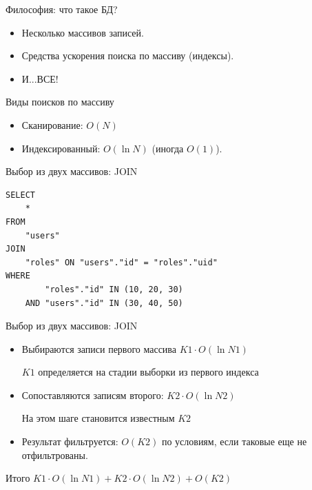 \documentclass[aspectratio=169]{beamer}
\begin{document}
\begin{frame}{Философия: что такое БД?}
    \begin{itemize}
        \item Несколько массивов записей.
        \pause\item Средства ускорения поиска по массиву (индексы).
        \pause\item И...\pause ВСЕ!
    \end{itemize}
\end{frame}

\begin{frame}{Виды поисков по массиву}
    \begin{itemize}
        \item Сканирование: $O(N)$
        \item Индексированный: $O(\ln N)$ (иногда $O(1)$).
    \end{itemize}
\end{frame}

\begin{frame}[fragile]{Выбор из двух массивов: JOIN}
\begin{verbatim}
SELECT
    *
FROM
    "users"
JOIN
    "roles" ON "users"."id" = "roles"."uid"
WHERE
        "roles"."id" IN (10, 20, 30)
    AND "users"."id" IN (30, 40, 50)
\end{verbatim}
\end{frame}

\begin{frame}{Выбор из двух массивов: JOIN}
    \begin{itemize}
        \item Выбираются записи первого массива $K1 \cdot O(\ln{N1})$
            \par {\small $K1$ определяется на стадии
                выборки из первого индекса}
        \item Сопоставляются записям второго: $K2 \cdot O(\ln{N2})$
            \par {\small На этом шаге становится известным $K2$}
        \item Результат фильтруется: $O(K2)$ по условиям,
          если таковые еще не отфильтрованы.
    \end{itemize}

    \begin{block}{Итого}
        $K1 \cdot O(\ln{N1}) + K2 \cdot O(\ln{N2}) + O(K2)$
    \end{block}
\end{frame}
\end{document}
